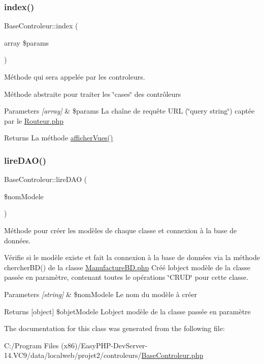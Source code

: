 \subsubsection{\texorpdfstring{index()}{index()}}
{\footnotesize\ttfamily Base\+Controleur\+::index (\begin{DoxyParamCaption}\item[{array}]{\$params }\end{DoxyParamCaption})\hspace{0.3cm}{\ttfamily [abstract]}}



Méthode qui sera appelée par les controleurs. 

Méthode abstraite pour traiter les \char`\"{}cases\char`\"{} des contrôleurs 
\begin{DoxyParams}{Parameters}
{\em \mbox{[}array\mbox{]}} & \$params La chaîne de requête U\+RL (\char`\"{}query string\char`\"{}) captée par le \hyperlink{_routeur_8php}{Routeur.\+php} \\
\hline
\end{DoxyParams}
\begin{DoxyReturn}{Returns}
La méthode \hyperlink{class_base_controleur_a5f865fc7aa819664eec62f5dbd0cd8f2}{afficher\+Vues()} 
\end{DoxyReturn}
\mbox{\label{class_base_controleur_a69ec4d8d399883fc3335422053791cdb}} 
\subsubsection{\texorpdfstring{lire\+D\+A\+O()}{lireDAO()}}
{\footnotesize\ttfamily Base\+Controleur\+::lire\+D\+AO (\begin{DoxyParamCaption}\item[{}]{\$nom\+Modele }\end{DoxyParamCaption})\hspace{0.3cm}{\ttfamily [protected]}}



Méthode pour créer les modèles de chaque classe et connexion à la base de données. 

Vérifie si le modèle existe et fait la connexion à la base de données via la méthode chercher\+B\+D() de la classe \hyperlink{_manufacture_b_d_8php}{Manufacture\+B\+D.\+php} Créé l\textquotesingle{}object modèle de la classe passée en paramètre, contenant toutes le opérations \char`\"{}\+C\+R\+U\+D\char`\"{} pour cette classe. 
\begin{DoxyParams}{Parameters}
{\em \mbox{[}string\mbox{]}} & \$nom\+Modele Le nom du modèle à créer \\
\hline
\end{DoxyParams}
\begin{DoxyReturn}{Returns}
\mbox{[}object\mbox{]} \$objet\+Modele L\textquotesingle{}object modèle de la classe passée en paramètre 
\end{DoxyReturn}


The documentation for this class was generated from the following file\+:\begin{DoxyCompactItemize}
\item 
C\+:/\+Program Files (x86)/\+Easy\+P\+H\+P-\/\+Dev\+Server-\/14.\+V\+C9/data/localweb/projet2/controleurs/\hyperlink{_base_controleur_8php}{Base\+Controleur.\+php}\end{DoxyCompactItemize}
